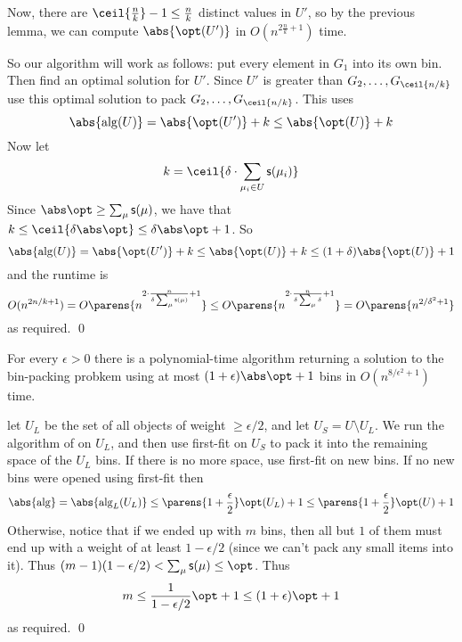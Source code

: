 Now, there are $\ceil{\frac nk}-1\leq\frac nk$ distinct values in $U'$, so by the previous lemma, we can compute $\abs{\opt(U')}$ in $O(n^{2\frac nk+1})$ time.

So our algorithm will work as follows: put every element in $G_1$ into its own bin.
Then find an optimal solution for $U'$.
Since $U'$ is greater than $G_2,\dots,G_{\ceil{n/k}}$ use this optimal solution to pack $G_2,\dots,G_{\ceil{n/k}}$.
This uses
$$ \abs{{\rm alg}(U)} = \abs{\opt(U')} + k \leq \abs{\opt(U)} + k $$
Now let
$$ k = \ceil{\delta\cdot\sum_{\mu_i\in U}\s s(\mu_i)} $$
Since $\abs\opt\geq\sum_\mu\s s(\mu)$, we have that $k\leq\ceil{\delta\abs\opt}\leq\delta\abs\opt+1$.
So
$$ \abs{{\rm alg}(U)} = \abs{\opt(U')} + k \leq \abs{\opt(U)} + k \leq (1+\delta)\abs{\opt(U)} + 1 $$
and the runtime is
$$ O(n^{2n/k+1}) = O\parens{n^{2\cdot\frac{n}{\delta\sum_\mu\s s(\mu)}+1}} \leq O\parens{n^{2\cdot\frac n{\delta\sum_\mu\delta}+1}} = O\parens{n^{2/\delta^2+1}} $$
as required.
\qed

\bthrm

    For every $\epsilon>0$ there is a polynomial-time algorithm returning a solution to the bin-packing probkem using at most $(1+\epsilon)\abs\opt+1$ bins in $O(n^{8/\epsilon^2+1})$ time.

\ethrm

\Proof let $U_L$ be the set of all objects of weight $\geq\epsilon/2$, and let $U_S=U\setminus U_L$.
We run the algorithm of  on $U_L$, and then use first-fit on $U_S$ to pack it into the remaining space of the $U_L$ bins.
If there is no more space, use first-fit on new bins.
If no new bins were opened using first-fit then
$$ \abs{\rm alg} = \abs{{\rm alg}_L(U_L)} \leq \parens{1+\frac\epsilon2}\opt(U_L) + 1 \leq \parens{1+\frac\epsilon2}\opt(U) + 1 $$
Otherwise, notice that if we ended up with $m$ bins, then all but $1$ of them must end up with a weight of at least $1-\epsilon/2$ (since we can't pack any small items into it).
Thus $(m-1)(1-\epsilon/2)<\sum_\mu\s s(\mu)\leq\opt$.
Thus
$$ m \leq \frac1{1-\epsilon/2}\opt + 1 \leq (1+\epsilon)\opt + 1 $$
as required.
\qed

